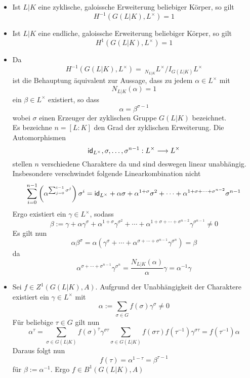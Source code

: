 \documentclass{book}
\renewcommand{\i}{^{-1}}
\begin{document}
\begin{itemize}
\item Ist $L|K$ eine zyklische, galoissche Erweiterung beliebiger Körper, so gilt
\[ H\i(G(L|K), L^\times) = 1 \]
\item Ist $L|K$ eine endliche, galoissche Erweiterung beliebiger Körper, so gilt
\[ H^1(G(L|K), L^\times) = 1 \]
\end{itemize}
\begin{Beweis}{}
\begin{itemize}
\item Da
\[ H\i(G(L|K), L^\times) = \ _{N_{L|K}}L^\times / I_{G(L|K)}L^\times \]
ist die Behauptung äquivalent zur Aussage, dass zu jedem $\alpha \in L^\times$ mit
\[ N_{L|K}(\alpha) = 1 \]
ein $\beta \in L^\times$ existiert, so dass
\[ \alpha = \beta^{\sigma - 1} \]
wobei $\sigma$ einen Erzeuger der zyklischen Gruppe $G(L|K)$ bezeichnet.\\
Es bezeichne $n = [L:K]$ den Grad der zyklischen Erweiterung. Die Automorphismen
\[ \textsf{id}_{L^{\times}}, \sigma, \ldots, \sigma^{n-1} : L^\times \overset{}{\longrightarrow} L^\times \]
stellen $n$ verschiedene Charaktere da und sind deswegen linear unabhängig. Insbesondere verschwindet folgende Linearkombination nicht
\[ \sum_{i=0}^{n-1} \left(\alpha^{\sum_{j = 0}^{i - 1} \sigma^j }\right) \sigma^i = \textsf{id}_{L^\times} + \alpha \sigma + \alpha^{1 + \sigma} \sigma^2 +  \cdots + \alpha^{1 + \sigma + \cdots + \sigma^{n-2}} \sigma^{n-1}  \]
 Ergo existiert ein $\gamma \in L^\times$, sodass
\[ \beta := \gamma + \alpha \gamma^\sigma + \alpha^{1 + \sigma} \gamma^{\sigma^2} + \cdots + \alpha^{1+\sigma + \cdots + \sigma^{n-2}}\gamma^{\sigma^{n-1}} \neq 0 \]
Es gilt nun
\[ \alpha \beta^\sigma = \alpha (\gamma^\sigma + \cdots + \alpha^{\sigma + \cdots + \sigma^{n-1}}\gamma^{\sigma^n} ) = \beta \]
da
\[ \alpha^{\sigma + \cdots + \sigma^{n-1}}\gamma^{\sigma^n} = \frac{N_{L|K}(\alpha)}{\alpha} \gamma = \alpha\i \gamma \]
\item Sei $f \in Z^1(G(L|K),A)$. Aufgrund der Unabhängigkeit der Charaktere existiert ein $\gamma \in L^\times$ mit
\[ \alpha := \sum_{\sigma \in G} f(\sigma) \gamma^\sigma \neq 0  \]
Für beliebige $\tau \in G$ gilt nun
\[ \alpha^\tau = \sum_{\sigma \in G(L|K)} f(\sigma)^\tau \gamma^{\sigma \tau} \sum_{\sigma \in G(L|K)} f(\sigma\tau)f(\tau\i) \gamma^{\sigma \tau} = f(\tau\i)\alpha \]
Daraus folgt nun
\[ f(\tau) = \alpha^{1 - \tau} = \beta^{\tau - 1} \]
für $\beta := \alpha\i$. Ergo $f \in B^1(G(L|K),A)$
\end{itemize}
\end{Beweis}
\end{document}
